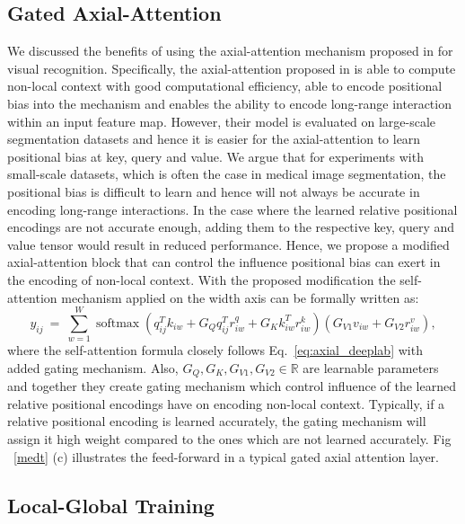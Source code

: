 \documentclass[runningheads]{llncs}
\begin{document}
	\subsection{Gated Axial-Attention} We discussed the benefits of using the axial-attention mechanism proposed in \cite{wang2020axial} for visual recognition. Specifically, the axial-attention proposed in \cite{wang2020axial} is able to compute non-local context with good computational efficiency, able to encode positional bias into the mechanism and enables the ability to encode long-range interaction within an input feature map. However, their model is evaluated on large-scale segmentation datasets and hence it is easier for the axial-attention to learn positional bias at key, query and value. We argue that for experiments with small-scale datasets, which is often the case in medical image segmentation, the positional bias is difficult to learn and hence will not always be accurate in encoding long-range interactions. In the case where the learned relative positional encodings are not accurate enough, adding them to the respective key, query and value tensor would result in reduced performance. Hence, we propose a modified axial-attention block that can control the influence positional bias can exert in the encoding of non-local context. With the proposed modification the self-attention mechanism applied on the width axis can be formally written as:
	\begin{equation}\label{eq:gated_axial}
	y_{ij} \ = \ \sum_{w=1}^{W} \operatorname{softmax} \left(q_{ij}^{T} k_{iw} + G_Q q_{ij}^{T} r^q_{iw} + G_K k_{iw}^{T} r^k_{iw}\right) ( G_{V1} v_{iw} + G_{V2} r^v_{iw}),
	\end{equation}
	where the self-attention formula closely follows Eq.~\ref{eq:axial_deeplab} with added gating mechanism. Also, $G_Q, G_K, G_{V1}, G_{V2} \in \mathbb{R}$ are learnable parameters and together they create gating mechanism which control influence of the learned relative positional encodings have on encoding non-local context. Typically, if a relative positional encoding is learned accurately, the gating mechanism will assign it high weight compared to the ones which are not learned accurately. Fig ~\ref{medt} (c) illustrates the feed-forward in a typical gated axial attention layer.
	
	\subsection{Local-Global Training}
\end{document}
